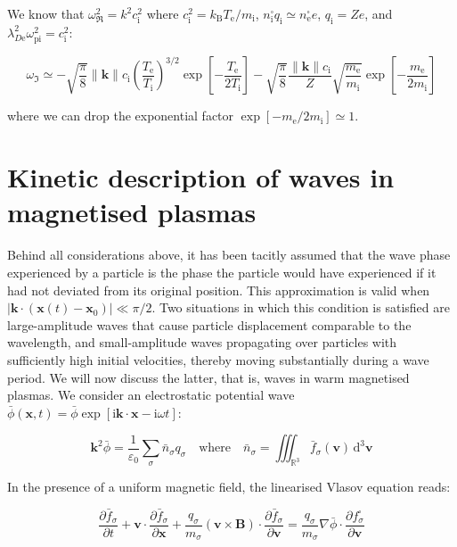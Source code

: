 We know that $\omega_{\Re}^2=k^2c_\mathrm{i}^2$ where $c_\mathrm{i}^2=k_\mathrm{B}T_\text{e}/m_\mathrm{i}$, $n_\mathrm{i}^\square q_\mathrm{i}\simeq n_\text{e}^\square e$, $q_\mathrm{i}=Ze$, and $\lambda_{D\text{e}}^2\omega_\text{pi}^2=c_\mathrm{i}^2$:

\begin{equation}
    \omega_{\Im}\simeq-\sqrt{\frac{\pi}{8}}\|\mathbf{k}\|c_\mathrm{i}\left(\frac{T_\text{e}}{T_\mathrm{i}}\right)^{3/2}\exp{\left[-\frac{T_\text{e}}{2T_\mathrm{i}}\right]}-\sqrt{\frac{\pi}{8}}\frac{\|\mathbf{k}\|c_\mathrm{i}}{Z}\sqrt{\frac{m_\text{e}}{m_\mathrm{i}}}\exp{\left[-\frac{m_\text{e}}{2m_\mathrm{i}}\right]}
\end{equation}

where we can drop the exponential factor $\exp{[-m_\text{e}/2m_\mathrm{i}]}\simeq1$.

\section{Kinetic description of waves in magnetised plasmas}

Behind all considerations above, it has been tacitly assumed that the wave phase experienced by a particle is the phase the particle would have experienced if it had not deviated from its original position. This approximation is valid when $|\mathbf{k}\cdot(\mathbf{x}(t)-\mathbf{x}_0)|\ll\pi/2$. Two situations in which this condition is satisfied are large-amplitude waves that cause particle displacement comparable to the wavelength, and small-amplitude waves propagating over particles with sufficiently high initial velocities, thereby moving substantially during a wave period. We will now discuss the latter, that is, waves in warm magnetised plasmas. We consider an electrostatic potential wave $\bar{\phi}(\mathbf{x},t)=\bar{\phi}\exp{[\mathrm{i}\mathbf{k}\cdot\mathbf{x}-\mathrm{i}\omega t]}$:

\begin{equation}
    \mathbf{k}^2\bar{\phi}=\frac{1}{\varepsilon_0}\sum_{\sigma}\bar{n}_\sigma q_\sigma\quad\text{where}\quad\bar{n}_\sigma=\iiint_{\mathbb{R}^3}\bar{f}_\sigma(\mathbf{v})\,\mathrm{d}^3\mathbf{v}
\end{equation}

In the presence of a uniform magnetic field, the linearised Vlasov equation reads:

\begin{equation}
    \frac{\partial\bar{f}_\sigma}{\partial t}+\mathbf{v}\cdot\frac{\partial\bar{f}_\sigma}{\partial\mathbf{x}}+\frac{q_\sigma}{m_\sigma}\left(\mathbf{v}\times\mathbf{B}\right)\cdot\frac{\partial\bar{f}_\sigma}{\partial\mathbf{v}}=\frac{q_\sigma}{m_\sigma}\nabla\bar{\phi}\cdot\frac{\partial f_\sigma^\square}{\partial\mathbf{v}}
\end{equation}

